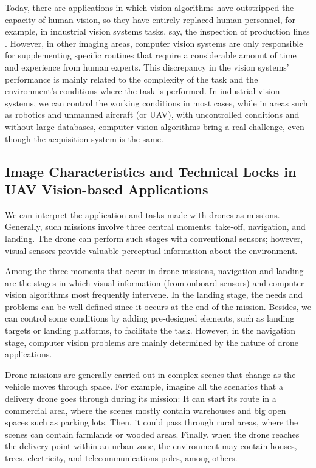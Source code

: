 Today, there are applications in which vision algorithms have outstripped the capacity of human vision, so they have entirely replaced human personnel, for example, in industrial vision systems tasks, say, the inspection of production lines \citep{Malamas.Petrakis.ea:IVC:2003}. However, in other imaging areas, computer vision systems are only responsible for supplementing specific routines that require a considerable amount of time and experience from human experts. This discrepancy in the vision systems' performance is mainly related to the complexity of the task and the environment's conditions where the task is performed. In industrial vision systems, we can control the working conditions in most cases, while in areas such as robotics and unmanned aircraft (or UAV), with uncontrolled conditions and without large databases, computer vision algorithms bring a real challenge, even though the acquisition system is the same. 

\subsection*{Image Characteristics and Technical Locks in UAV Vision-based Applications}
 
We can interpret the application and tasks made with drones as missions. Generally, such missions involve three central moments: take-off, navigation, and landing. The drone can perform such stages with conventional sensors; however, visual sensors provide valuable perceptual information about the environment.

Among the three moments that occur in drone missions, navigation and landing are the stages in which visual information (from onboard sensors) and computer vision algorithms most frequently intervene. In the landing stage, the needs and problems can be well-defined since it occurs at the end of the mission. Besides, we can control some conditions by adding pre-designed elements, such as landing targets or landing platforms, to facilitate the task. However, in the navigation stage, computer vision problems are mainly determined by the nature of drone applications.

Drone missions are generally carried out in complex scenes that change as the vehicle moves through space. For example, imagine all the scenarios that a delivery drone goes through during its mission: It can start its route in a commercial area, where the scenes mostly contain warehouses and big open spaces such as parking lots. Then, it could pass through rural areas, where the scenes can contain farmlands or wooded areas. Finally, when the drone reaches the delivery point within an urban zone, the environment may contain houses, trees, electricity, and telecommunications poles, among others. 

